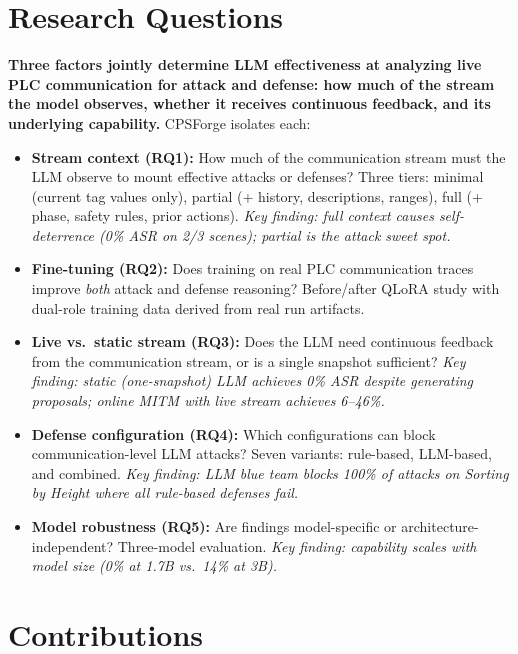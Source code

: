 \documentclass[11pt]{article}
\begin{document}
\section*{Research Questions}

\textbf{Three factors jointly determine LLM effectiveness at analyzing live PLC communication for attack and defense: how much of the stream the model observes, whether it receives continuous feedback, and its underlying capability.} CPSForge isolates each:

\begin{itemize}[leftmargin=1.5em]
    \item \textbf{Stream context (RQ1):} How much of the communication stream must the LLM observe to mount effective attacks or defenses? Three tiers: minimal (current tag values only), partial (+ history, descriptions, ranges), full (+ phase, safety rules, prior actions). \emph{Key finding: full context causes self-deterrence (0\% ASR on 2/3 scenes); partial is the attack sweet spot.}
    \item \textbf{Fine-tuning (RQ2):} Does training on real PLC communication traces improve \emph{both} attack and defense reasoning? Before/after QLoRA study with dual-role training data derived from real run artifacts.
    \item \textbf{Live vs.\ static stream (RQ3):} Does the LLM need continuous feedback from the communication stream, or is a single snapshot sufficient? \emph{Key finding: static (one-snapshot) LLM achieves 0\% ASR despite generating proposals; online MITM with live stream achieves 6--46\%.}
    \item \textbf{Defense configuration (RQ4):} Which configurations can block communication-level LLM attacks? Seven variants: rule-based, LLM-based, and combined. \emph{Key finding: LLM blue team blocks 100\% of attacks on Sorting by Height where all rule-based defenses fail.}
    \item \textbf{Model robustness (RQ5):} Are findings model-specific or architecture-independent? Three-model evaluation. \emph{Key finding: capability scales with model size (0\% at 1.7B vs.\ 14\% at 3B).}
\end{itemize}

\section*{Contributions}
\end{document}
